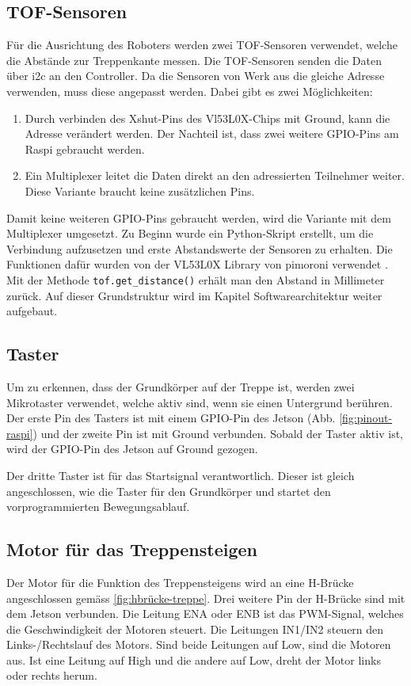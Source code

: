\newpage
\subsection{TOF-Sensoren}
Für die Ausrichtung des Roboters werden zwei TOF-Sensoren verwendet, welche die Abstände zur Treppenkante messen. Die TOF-Sensoren senden die Daten über \acrshort{i2c} an den Controller. Da die Sensoren von Werk aus die gleiche Adresse verwenden, muss diese angepasst werden. Dabei gibt es zwei Möglichkeiten:
\begin{enumerate}
    \item Durch verbinden des Xshut-Pins des Vl53L0X-Chips mit Ground, kann die Adresse verändert werden. Der Nachteil ist, dass zwei weitere GPIO-Pins am Raspi gebraucht werden. 
    \item Ein Multiplexer leitet die Daten direkt an den adressierten Teilnehmer weiter. Diese Variante braucht keine zusätzlichen Pins.
\end{enumerate}
Damit keine weiteren GPIO-Pins gebraucht werden, wird die Variante mit dem Multiplexer umgesetzt. Zu Beginn wurde ein Python-Skript erstellt, um die Verbindung aufzusetzen und erste Abstandswerte der Sensoren zu erhalten. Die Funktionen dafür wurden von der VL53L0X Library von pimoroni verwendet \cite{VL53L0X-Library}. Mit der Methode \texttt{tof.get\_distance()} erhält man den Abstand in Millimeter zurück. Auf dieser Grundstruktur wird im Kapitel Softwarearchitektur weiter aufgebaut.

\subsection{Taster}
Um zu erkennen, dass der Grundkörper auf der Treppe ist, werden zwei Mikrotaster verwendet, welche aktiv sind, wenn sie einen Untergrund berühren. Der erste Pin des Tasters ist mit einem GPIO-Pin des Jetson (Abb. \ref{fig:pinout-raspi}) und der zweite Pin ist mit Ground verbunden. Sobald der Taster aktiv ist, wird der GPIO-Pin des Jetson auf Ground gezogen. 

Der dritte Taster ist für das Startsignal verantwortlich. Dieser ist gleich angeschlossen, wie die Taster für den Grundkörper und startet den vorprogrammierten Bewegungsablauf.

\subsection{Motor für das Treppensteigen}
Der Motor für die Funktion des Treppensteigens wird an eine H-Brücke angeschlossen gemäss \ref{fig:hbrücke-treppe}. Drei weitere Pin der H-Brücke sind mit dem Jetson verbunden. Die Leitung ENA oder ENB ist das PWM-Signal, welches die Geschwindigkeit der Motoren steuert. Die Leitungen IN1/IN2 steuern den Links-/Rechtslauf des Motors. Sind beide Leitungen auf Low, sind die Motoren aus. Ist eine Leitung auf High und die andere auf Low, dreht der Motor links oder rechts herum.

